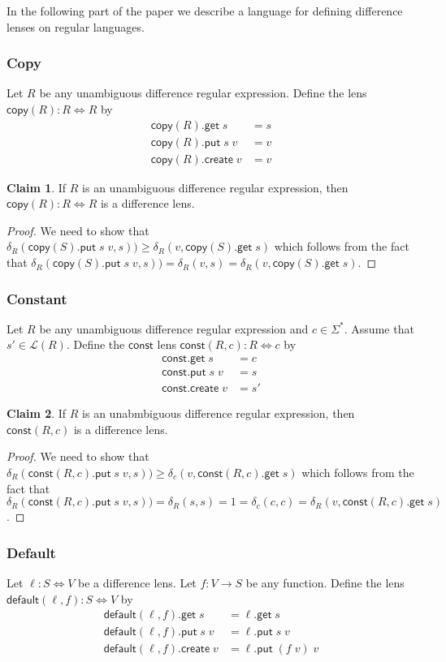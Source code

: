 \documentclass[acmsmall,review,anonymous]{acmart}\settopmatter{printfolios=true,printccs=false,printacmref=false}
\theoremstyle{definition}
\newtheorem{claim}{Claim}
\newcommand{\kw}[1]{\ensuremath{\mathsf{#1}}\xspace}
\newcommand{\get}{\ensuremath{\kw{get}}\xspace}
\newcommand{\pput}{\ensuremath{\kw{put}}\xspace}
\newcommand{\create}{\ensuremath{\kw{create}}\xspace}
\newcommand{\ccopy}{\ensuremath{\kw{copy}}\xspace}
\newcommand{\const}{\ensuremath{\kw{const}}\xspace}
\newcommand{\default}{\ensuremath{\kw{default}}\xspace}
\begin{document}
In the following part of the paper we describe a language for defining difference lenses on regular languages.
\subsubsection{Copy}
Let $R$ be any unambiguous difference regular expression. Define the lens $\ccopy(R) : R \Leftrightarrow R$ by
\begin{align}
\ccopy(R).\get \; s &= s\\
\ccopy(R).\pput \; s \; v &= v\\
\ccopy(R).\create \; v &= v
\end{align}
\begin{claim}
If $R$ is an unambiguous difference regular expression, then $\ccopy(R) : R \Leftrightarrow R$ is a difference lens.
\end{claim}
\begin{proof}
We need to show that $\delta_R(\ccopy(S).\pput
\; s \; v, s)) \geq \delta_R(v, \ccopy(S).\get \; s)$ which follows from the fact that $\delta_R(\ccopy(S).\pput \; s
\; v, s)) = \delta_R(v, s) = \delta_R(v, \ccopy(S).\get \; s) $.
\end{proof}
\subsubsection{Constant}
Let $R$ be any unambiguous difference regular expression and $c \in \Sigma^*$. Assume that $s' \in \mathcal{L}(R)$. Define the \const lens $\const(R, c) : R
\Leftrightarrow c$ by
\begin{align*}
\const.\get \; s &= c\\
\const.\pput \; s \; v &= s\\
\const.\create \; v &= s'
\end{align*}
\begin{claim}
If $R$ is an unabmbiguous difference regular expression, then $\const(R, c)$ is a difference lens.
\end{claim}
\begin{proof}
We need to show that $\delta_R(\const(R, c).\pput
\; s \; v, s)) \geq \delta_c(v, \const(R, c).\get \; s)$ which follows from the fact that $\delta_R(\const(R, c).\pput
\; s \; v, s)) = \delta_R(s, s) = 1 = \delta_c(c, c) = \delta_R(v, \const(R, c).\get \; s)$.
\end{proof}

\subsubsection{Default}
Let $\ell : S \Leftrightarrow V$ be a difference lens. Let $f :
V \longrightarrow S$ be any function. Define the lens $\default(\ell, f) :
S \Leftrightarrow V$ by
\begin{align*}
\default(\ell, f).\get \; s &= \ell.\get \; s\\
\default(\ell, f).\pput \; s \; v &= \ell.\pput \; s \; v\\
\default(\ell, f).\create \; v &= \ell.\pput \; (f \; v) \; v
\end{align*}
 
\end{document}
